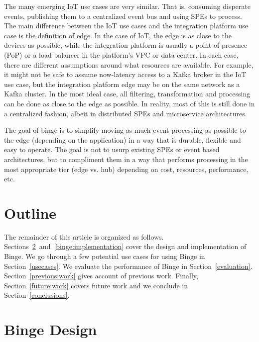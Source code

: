 \documentclass[10pt,twocolumn]{article}
\begin{document}
The many emerging IoT use cases are very similar.  That is, consuming disperate
events, publishing them to a centralized event bus and using SPEs to process.
The main difference between the IoT use cases and the integration platform use
case is the definition of edge.  In the case of IoT, the edge is as close to
the devices as possible, while the integration platform is usually a
point-of-presence (PoP) or a load balancer in the platform's VPC or data
center.   In each case, there are different assumptions around what resources
are available.  For example, it might not be safe to assume now-latency access
to a Kafka broker in the IoT use case, but the integration platform edge may be
on the same network as a Kafka cluster.  In the most ideal case, all filtering,
transformation and processing can be done as close to the edge as possible.  In
reality, most of this is still done in a centralized fashion, albeit in
distributed SPEs and microservice architectures.

The goal of binge is to simplify moving as much event processing as possible to
the edge (depending on the application) in a way that is durable, flexible and
easy to operate.  The goal is not to usurp existing SPEs or event based
architectures, but to compliment them in a way that performs processing in the
most appropriate tier (edge vs. hub) depending on cost, resources, performance,
etc.

\section{Outline}
The remainder of this article is organized as follows.
Sections~\ref{binge:design}~and~\ref{binge:implementation} cover the design and
implementation of Binge.  We go through a few potential use cases for using
Binge in Section~\ref{usecases}.  We evaluate the performance of Binge in
Section~\ref{evaluation}.  Section~\ref{previous:work} gives account of
previous work.  Finally, Section~\ref{future:work} covers future work and we
conclude in Section~\ref{conclusions}.

\section{Binge Design}\label{binge:design}
\end{document}

